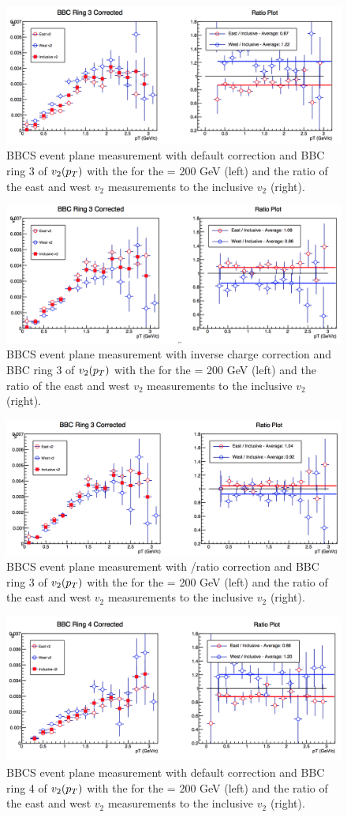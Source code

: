 \begin{figure}

\includegraphics[width=0.65\linewidth]{figs/bbc_3_default.png}
\caption{BBCS event plane measurement with default correction and BBC ring 3 of $v_{2}(\mbox{$p_T$})$ with the  for the \pau \sqsn = 200 GeV (left) and the ratio of the east and west $v_2$ measurements to the inclusive $v_2$ (right).}
\end{figure}

\begin{figure}
\includegraphics[width=0.65\linewidth]{figs/bbc_3_data.png}
\caption{BBCS event plane measurement with inverse charge correction and BBC ring 3 of $v_{2}(\mbox{$p_T$})$ with the  for the \pau \sqsn = 200 GeV (left) and the ratio of the east and west $v_2$ measurements to the inclusive $v_2$ (right).}
\end{figure}

\begin{figure}
\centering
\includegraphics[width=0.65\linewidth]{figs/bbc_3_pp.png}
\caption{BBCS event plane measurement with \pp/\pau ratio correction and BBC ring 3 of $v_{2}(\mbox{$p_T$})$ with the  for the \pau \sqsn = 200 GeV (left) and the ratio of the east and west $v_2$ measurements to the inclusive $v_2$ (right).}
\end{figure}
\clearpage
\begin{figure}
\centering
\includegraphics[width=0.65\linewidth]{figs/bbc_4_default.png}
\caption{BBCS event plane measurement with default correction and BBC ring 4 of $v_{2}(\mbox{$p_T$})$ with the  for the \pau \sqsn = 200 GeV (left) and the ratio of the east and west $v_2$ measurements to the inclusive $v_2$ (right).}
\end{figure}

